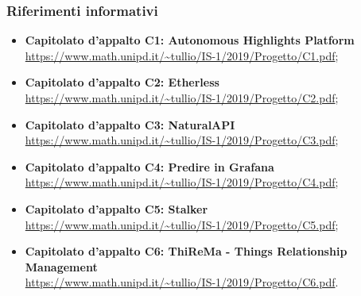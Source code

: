 	\subsubsection{Riferimenti informativi}
	\begin{itemize}
		\item \textbf{Capitolato d'appalto C1: Autonomous Highlights Platform} \\ 			\url{https://www.math.unipd.it/~tullio/IS-1/2019/Progetto/C1.pdf};
		
		\item \textbf{Capitolato d'appalto C2: Etherless} \\ 			\url{https://www.math.unipd.it/~tullio/IS-1/2019/Progetto/C2.pdf};
		
		\item \textbf{Capitolato d'appalto C3: 	NaturalAPI} \\ 			\url{https://www.math.unipd.it/~tullio/IS-1/2019/Progetto/C3.pdf};
		
		\item \textbf{Capitolato d'appalto C4: Predire in Grafana} \\ 			\url{https://www.math.unipd.it/~tullio/IS-1/2019/Progetto/C4.pdf};
		
		\item \textbf{Capitolato d'appalto C5: Stalker} \\ 			\url{https://www.math.unipd.it/~tullio/IS-1/2019/Progetto/C5.pdf};
		
		\item \textbf{Capitolato d'appalto C6: ThiReMa - Things Relationship Management} \\ 			\url{https://www.math.unipd.it/~tullio/IS-1/2019/Progetto/C6.pdf}.	
	\end{itemize}